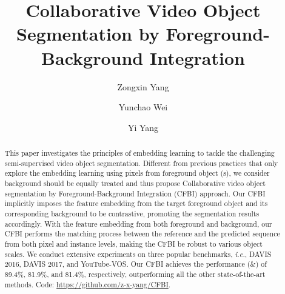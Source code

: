 \documentclass[runningheads]{llncs}
\def\ie{\emph{i.e.}}
\begin{document}
\pagestyle{headings}
\mainmatter
\def\ECCVSubNumber{3385}  

\title{Collaborative Video Object Segmentation by Foreground-Background Integration} 

\begin{comment}
\titlerunning{ECCV-20 submission ID \ECCVSubNumber} 
\authorrunning{ECCV-20 submission ID \ECCVSubNumber} 
\author{Anonymous ECCV submission}
\institute{Paper ID \ECCVSubNumber}
\end{comment}


\author{Zongxin Yang \and
Yunchao Wei \and
Yi Yang}
\maketitle

\renewcommand{\thefootnote}{*}

\setlength{\intextsep}{0pt}

\begin{abstract}
This paper investigates the principles of embedding learning to tackle the challenging semi-supervised video object segmentation.
Different from previous practices that only explore the embedding learning using pixels from foreground object (s), we consider background should be equally treated and thus propose Collaborative video object segmentation by Foreground-Background Integration (CFBI) approach. Our CFBI implicitly imposes the feature embedding from the target foreground object and its corresponding background to be contrastive, promoting the segmentation results accordingly.  With the feature embedding from both foreground and background, our CFBI performs the matching process between the reference and the predicted sequence from both pixel and instance levels,  making the CFBI be robust to various object scales. We conduct extensive experiments on three popular benchmarks, \ie, DAVIS 2016, DAVIS 2017, and YouTube-VOS. Our CFBI achieves the performance (\&) of 89.4\%, 81.9\%, and 81.4\%, respectively, outperforming all the other state-of-the-art methods. Code: \url{https://github.com/z-x-yang/CFBI}.


\end{abstract}
\end{document}

